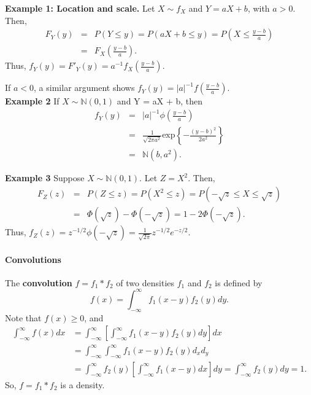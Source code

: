 \documentclass[12pt,oneside]{article}
\begin{document}
\noindent \textbf{Example 1: Location and scale.}  Let $X \sim f_X$ and $Y = aX+b$, with $a>0$.  Then,
\begin{eqnarray*} F_Y(y) &=& P(Y \leq y) = P(aX+b \leq y)  = P(X \leq \frac{y-b}{a}) \\ &=& F_X (\frac{y-b}{a}). \end{eqnarray*}
Thus, $f_Y (y) = F'_Y (y) = a^{-1} f_X(\frac{y-b}{a}).$

If $a<0$, a similar argument shows $f_Y(y) = |a|^{-1} f(\frac{y-b}{a})$.  \\

\noindent \textbf {Example 2} If $X \sim \mathbb{N}(0,1)$ and Y = aX + b, then
\begin{eqnarray*} f_Y(y) &=& |a|^{-1} \phi (\frac{y-b}{a}) \\ &=& \frac{1}{\sqrt{2 \pi a^2}} \mbox{exp} \left\{ -\frac{(y-b)^2}{2a^2} \right\} \\ &=&   \mathbb{N}(b,a^2). \end{eqnarray*}

\noindent \textbf{Example 3} Suppose $X \sim \mathbb{N}(0,1)$.  Let $Z = X^2$.  Then,
\begin{eqnarray*}  F_Z (z) &=& P(Z \leq z) = P(X^2 \leq z) = P(-\sqrt{z} \leq X \leq \sqrt{z}) \\ &=& \Phi(\sqrt{z}) - \Phi(-\sqrt{z}) = 1-2\Phi(-\sqrt{z}). \end{eqnarray*}
Thus, $f_Z(z) = z^{-1/2} \phi (-\sqrt{z}) = \frac{1}{\sqrt{2 \pi}} z^{-1/2} e^{-z/2}$. \\

\paragraph{Convolutions}
The \textbf{convolution} $f=f_1 \ast f_2$ of two densities $f_1$ and $f_2$ is defined by \[f(x) = \int_{-\infty}^{\infty} f_1(x-y)f_2(y)dy.\]
Note that $f(x) \geq 0$, and
\begin{align*}
\int_{-\infty}^{\infty} f(x) dx &= \int_{-\infty}^{\infty} \left[\int_{-\infty}^{\infty}  f_1(x-y)f_2(y)dy\right]dx \\
&=  \int_{-\infty}^{\infty} \int_{-\infty}^{\infty} f_1(x-y)f_2(y)d_xd_y\\
&= \int_{-\infty}^{\infty} f_2(y) \left[\int_{-\infty}^{\infty} f_1 (x-y)dx \right] dy = \int_{-\infty}^{\infty}f_2(y)dy = 1.
\end{align*}
So, $f = f_1 \ast f_2$ is a density. \\
\end{document}
